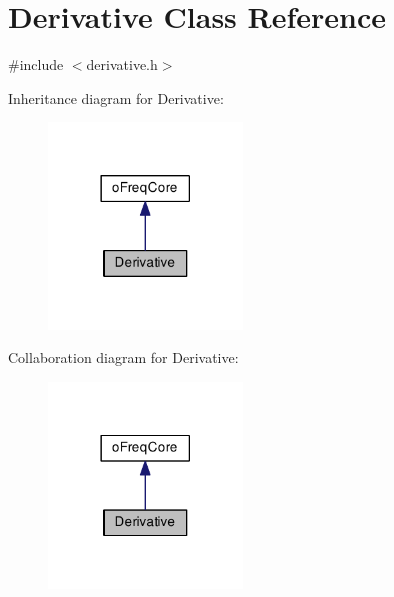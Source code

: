 \hypertarget{class_derivative}{\section{Derivative Class Reference}
\label{class_derivative}
}


{\ttfamily \#include $<$derivative.\-h$>$}



Inheritance diagram for Derivative\-:\nopagebreak
\begin{figure}[H]
\begin{center}
\leavevmode
\includegraphics[width=146pt]{class_derivative__inherit__graph}
\end{center}
\end{figure}


Collaboration diagram for Derivative\-:\nopagebreak
\begin{figure}[H]
\begin{center}
\leavevmode
\includegraphics[width=146pt]{class_derivative__coll__graph}
\end{center}
\end{figure}
